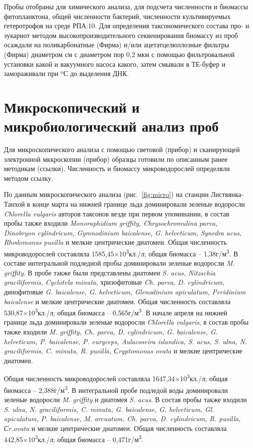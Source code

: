 \documentclass[a4paper,12pt,openany,final]{extreport}
\begin{document}
Пробы отобраны для химического анализа, для подсчета численности и
биомассы фитопланктона, общей численности бактерий, численности
культивируемых гетеротрофов на среде РПА:10. Для определения
таксономического состава про- и эукариот методом высокопроизводительного
секвенирования биомассу из проб осаждали на поликарбонатные (Фирма)
и/или ацетатцелюллозные фильтры (Фирма) диаметром см с диаметром пор 0,2
мкм с помощью фильтровальной установки какой и вакуумного насоса какого,
затем смывали в ТЕ-буфер и замораживали при ºС до выделения ДНК.

\section{Микроскопический и микробиологический анализ проб}

Для микроскопического анализа с помощью световой (прибор) и сканирующей
электронной мккроскопии (прибор) образцы готовили по описанным ранее
методикам (ссылки). Численность и биомассу микроводорослей определяли
методом ссылку.

По данным микроскопического анализа (рис.~\ref{fig:micro}) на станции Листвянка-Танхой
в конце марта на нижней границе льда доминировали зеленые водоросли
\emph{Chlorella vulgaris} авторов таксонов везде при первом упоминании,
в состав пробы также входили \emph{Monoraphidium griffity,
Chrysochromulina parva, Dinobryon cylindricum, Gymnodinium baicalense,
G. helveticum, Synedra acus, Rhodomonas pusilla} и мелкие центрические
диатомеи. Общая численность микроводорослей составляла
1585,45×10\textsuperscript{3}кл./л; общая биомасса --
1,38г/м\textsuperscript{3}. В составе интегральной подледной пробы
доминировали зеленые водоросли \emph{M. griffity}. В пробе также были
представлены диатомеи \emph{S. acus, Nitzschia graciliformis, Cyclotela
minuta,} хризофитовые \emph{Ch. parva, D. cylindricum,} динофитовые
\emph{G. baicalense, G. helveticum, Glenodinium apiculatum, Peridinium
baicalense} и мелкие центрические диатомеи. Общая численность составляла
530,87×10\textsuperscript{3}кл./л; общая биомасса --
0,565г/м\textsuperscript{3}. В начале апреля на нижней границе льда
доминировали зеленые водоросли \emph{Chlorella vulgaris}, в состав пробы
также входили \emph{M. griffity, Ch. parva, D. cylindricum, G.
baicalense, G. helveticum, P. baicalense, P. euryceps, Aulacoseira
islandica, S. acus, S. ulna, N. graciliformis, C. minuta, R. pusilla,
Сryptomonas ovata} и мелкие центрические диатомеи.

Общая численность микроводорослей составляла
1647,34×10\textsuperscript{3}кл./л; общая биомасса --
2,388г/м\textsuperscript{3}. В интегральной пробе подледой воды
доминировали зеленые водоросли \emph{M. griffity} и диатомея \emph{S.
acus}. В состав пробы также входили \emph{S. ulna, N. graciliformis, C.
minuta, G. baicalense, G. helveticum, Gl. apiculatum, P. baicalense, M.
arcuatum, Ch. parva, D. cylindricum, R. pusilla, Сr.ovata} и мелкие
центрические диатомеи. Общая численность составляла
442,85×10\textsuperscript{3}кл./л; общая биомасса --
0,471г/м\textsuperscript{3}.
\end{document}
